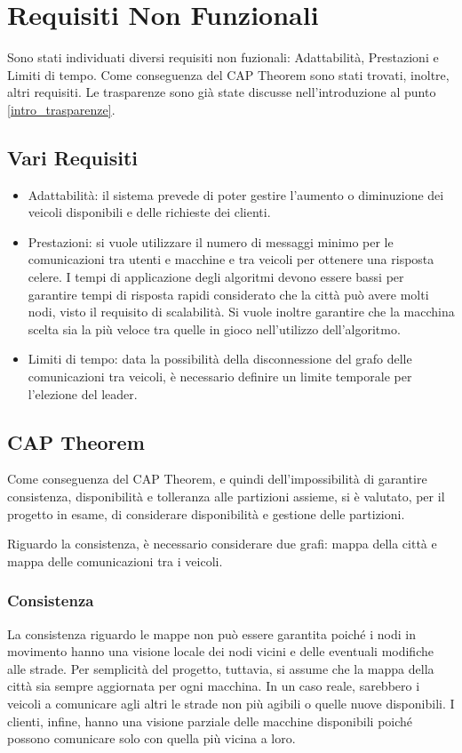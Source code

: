 \section{Requisiti Non Funzionali} \label{requisiti_non_funzionali}
Sono stati individuati diversi requisiti non fuzionali: Adattabilità, Prestazioni e Limiti di tempo. Come conseguenza del CAP Theorem sono stati trovati, inoltre, altri requisiti.
Le trasparenze sono già state discusse nell'introduzione al punto \ref{intro_trasparenze}.

\subsection{Vari Requisiti}
\begin{itemize}
	\item Adattabilità: il sistema prevede di poter gestire l'aumento o diminuzione dei veicoli disponibili e delle richieste dei clienti.
	\item Prestazioni: si vuole utilizzare il numero di messaggi minimo per le comunicazioni tra utenti e macchine e tra veicoli per ottenere una risposta celere. I tempi di applicazione degli algoritmi devono essere bassi per garantire tempi di risposta rapidi considerato che la città può avere molti nodi, visto il requisito di scalabilità. Si vuole inoltre garantire che la macchina scelta sia la più veloce tra quelle in gioco nell'utilizzo dell'algoritmo.
	\item Limiti di tempo: data la possibilità della disconnessione del grafo delle comunicazioni tra veicoli, è necessario definire un limite temporale per l'elezione del leader.
\end{itemize}

\subsection{CAP Theorem}
Come conseguenza del CAP Theorem, e quindi dell'impossibilità di garantire consistenza, disponibilità e tolleranza alle partizioni assieme, si è valutato, per il progetto in esame, di considerare disponibilità e gestione delle partizioni.

Riguardo la consistenza, è necessario considerare due grafi: mappa della città e mappa delle comunicazioni tra i veicoli. 

\subsubsection{Consistenza}
La consistenza riguardo le mappe non può essere garantita poiché i nodi in movimento hanno una visione locale dei nodi vicini e delle eventuali modifiche alle strade. Per semplicità del progetto, tuttavia, si assume che la mappa della città sia sempre aggiornata per ogni macchina. In un caso reale, sarebbero i veicoli a comunicare agli altri le strade non più agibili o quelle nuove disponibili. I clienti, infine, hanno una visione parziale delle macchine disponibili poiché possono comunicare solo con quella più vicina a loro.

